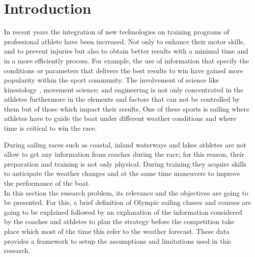 \chapter{Introduction}


In recent years the integration of new technologies on training programs of professional athlete have been increased. Not only to enhance their motor skills, and to prevent injuries but also to obtain better results with a minimal time and in a more efficiently process. For example, the use of information that specify the conditions or parameters that delivers the best results to win have gained more popularity within the sport community. The involvement of science like kinesiology \cite{sjogaard2015science}, movement science; and engineering is not only concentrated in the athletes furthermore in the elements and factors that can not be controlled by them but of those which impact their results. One of these sports is sailing where athletes have to guide the boat under different weather conditions and where time is critical to win the race.\newline

During sailing races such as coastal, inland waterways and lakes athletes are not allow to get any information from coaches during the race; for this reason, their preparation and training is not only physical. During training they acquire skills to anticipate the weather changes and at the same time maneuvers to improve the performance of the boat. \\

In this section the research problem, its relevance and the objectives are going to be presented. For this, a brief definition of Olympic sailing classes and courses are going to be explained followed by an explanation of the information considered by the coaches and athletes to plan the strategy before the competition take place which most of the time this refer to the weather forecast. These data provides a framework to setup the assumptions and limitations used in this research.
\\

